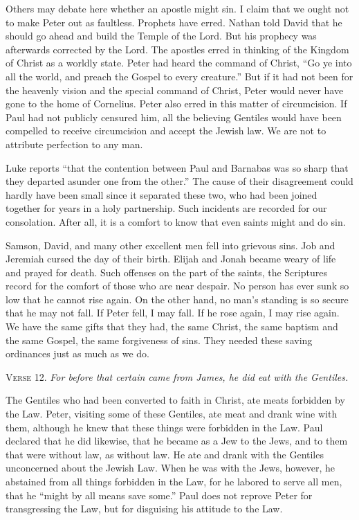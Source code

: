 Others may debate here whether an apostle might sin. I claim that we ought not to make Peter out as faultless. Prophets have erred. Nathan told David that he should go ahead and build the Temple of the Lord. But his prophecy was afterwards corrected by the Lord. The apostles erred in thinking of the Kingdom of Christ as a worldly state. Peter had heard the command of Christ, “Go ye into all the world, and preach the Gospel to every creature.” But if it had not been for the heavenly vision and the special command of Christ, Peter would never have gone to the home of Cornelius. Peter also erred in this matter of circumcision. If Paul had not publicly censured him, all the believing Gentiles would have been compelled to receive circumcision and accept the Jewish law. We are not to attribute perfection to any man.

Luke reports “that the contention between Paul and Barnabas was so sharp that they departed asunder one from the other.” The cause of their disagreement could hardly have been small since it separated these two, who had been joined together for years in a holy partnership. Such incidents are recorded for our consolation. After all, it is a comfort to know that even saints might and do sin.

Samson, David, and many other excellent men fell into grievous sins. Job and Jeremiah cursed the day of their birth. Elijah and Jonah became weary of life and prayed for death. Such offenses on the part of the saints, the Scriptures record for the comfort of those who are near despair. No person has ever sunk so low that he cannot rise again. On the other hand, no man’s standing is so secure that he may not fall. If Peter fell, I may fall. If he rose again, I may rise again. We have the same gifts that they had, the same Christ, the same baptism and the same Gospel, the same forgiveness of sins. They needed these saving ordinances just as much as we do.

\textsc{Verse} 12. \emph{For before that certain came from James, he did eat with the Gentiles.}

The Gentiles who had been converted to faith in Christ, ate meats forbidden by the Law. Peter, visiting some of these Gentiles, ate meat and drank wine with them, although he knew that these things were forbidden in the Law. Paul declared that he did likewise, that he became as a Jew to the Jews, and to them that were without law, as without law. He ate and drank with the Gentiles unconcerned about the Jewish Law. When he was with the Jews, however, he abstained from all things forbidden in the Law, for he labored to serve all men, that he “might by all means save some.” Paul does not reprove Peter for transgressing the Law, but for disguising his attitude to the Law.

